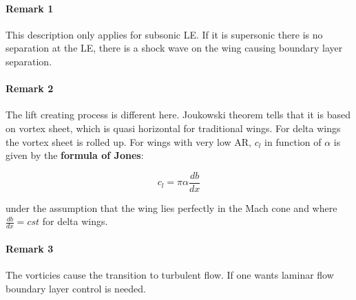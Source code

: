 \paragraph{Remark 1}
	This description only applies for subsonic LE. If it is supersonic there is no separation at the LE, there is a shock wave on the wing causing boundary layer separation.  
	
\paragraph{Remark 2}
	The lift creating process is different here. Joukowski theorem tells that it is based on vortex sheet, which is quasi horizontal for traditional wings. For delta wings the vortex sheet is rolled up. For wings with very low AR, $c_l$ in function of $\alpha$ is given by the \textbf{formula of Jones}:
	
	\begin{equation}
	c_l = \pi \alpha \frac{db}{dx}
	\end{equation}	 

	under the assumption that the wing lies perfectly in the Mach cone and where $\frac{db}{dx}=cst$ for delta wings. 
	
\paragraph{Remark 3}
	The vorticies cause the transition to turbulent flow. If one wants laminar flow boundary layer control is needed. 